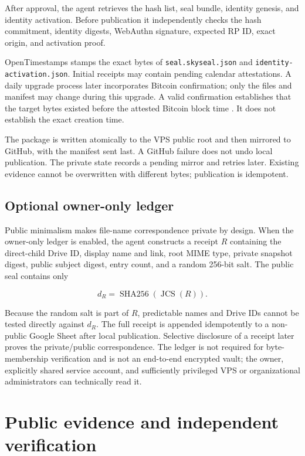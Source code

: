 \documentclass[11pt,a4paper]{article}
\newcommand{\code}[1]{\texttt{\detokenize{#1}}}
\newcommand{\sha}{\operatorname{SHA256}}
\newcommand{\jcs}{\operatorname{JCS}}
\begin{document}
After approval, the agent retrieves the hash list, seal bundle, identity genesis, and identity activation. Before publication it independently checks the hash commitment, identity digests, WebAuthn signature, expected RP ID, exact origin, and activation proof.

OpenTimestamps stamps the exact bytes of \nolinkurl{seal.skyseal.json} and \nolinkurl{identity-activation.json}. Initial receipts may contain pending calendar attestations. A daily upgrade process later incorporates Bitcoin confirmation; only the \code{.ots} files and manifest may change during this upgrade. A valid confirmation establishes that the target bytes existed before the attested Bitcoin block time \cite{ots2026}. It does not establish the exact creation time.

The package is written atomically to the VPS public root and then mirrored to GitHub, with the manifest sent last. A GitHub failure does not undo local publication. The private state records a pending mirror and retries later. Existing evidence cannot be overwritten with different bytes; publication is idempotent.

\subsection{Optional owner-only ledger}

Public minimalism makes file-name correspondence private by design. When the owner-only ledger is enabled, the agent constructs a receipt $R$ containing the direct-child Drive ID, display name and link, root MIME type, private snapshot digest, public subject digest, entry count, and a random 256-bit salt. The public seal contains only

\begin{equation}
d_R = \sha(\jcs(R)).
\end{equation}

Because the random salt is part of $R$, predictable names and Drive IDs cannot be tested directly against $d_R$. The full receipt is appended idempotently to a non-public Google Sheet after local publication. Selective disclosure of a receipt later proves the private/public correspondence. The ledger is not required for byte-membership verification and is not an end-to-end encrypted vault; the owner, explicitly shared service account, and sufficiently privileged VPS or organizational administrators can technically read it.

\section{Public evidence and independent verification}
\end{document}
